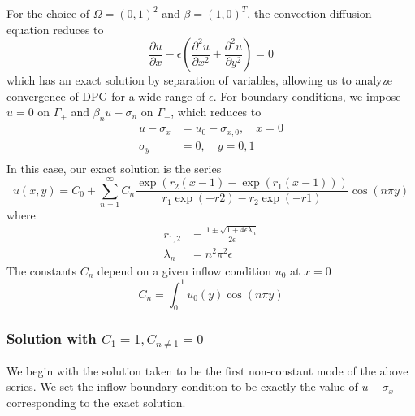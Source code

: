 \documentclass[11pt,onecolumn]{scrartcl}
\newcommand{\pd}[2]{\frac{\partial#1}{\partial#2}}
\newcommand{\pdd}[2]{\frac{\partial^2#1}{\partial#2^2}}
\begin{document}
For the choice of $\Omega = (0,1)^2$ and $\beta = (1,0)^T$, the convection diffusion equation reduces to
\[
\pd{u}{x} - \epsilon \left(\pdd{u}{x}+ \pdd{u}{y}\right) = 0
\]
which has an exact solution by separation of variables, allowing us to analyze convergence of DPG for a wide range of $\epsilon$.  For boundary conditions, we impose $u=0$ on $\Gamma_+$ and $\beta_n u - \sigma_n$ on $\Gamma_-$, which reduces to
\begin{align*}
u-\sigma_x &= u_0-\sigma_{x,0}, \quad x=0\\
\sigma_y &=  0, \quad y=0,1\\
\end{align*}
In this case, our exact solution is the series
\[
u(x,y) = C_0 + \sum_{n=1}^\infty C_n \frac{\exp(r_2(x-1)-\exp(r_1(x-1)))}{r_1\exp(-r2) - r_2\exp(-r1)}\cos(n\pi y)
\]
where
\begin{align*}
r_{1,2} &= \frac{1 \pm \sqrt{1 + 4 \epsilon\lambda_n}}{2 \epsilon}\\
\lambda_n &= n^2\pi^2 \epsilon
\end{align*}
The constants $C_n$ depend on a given inflow condition $u_0$ at $x=0$
\[
C_n = \int_0^1 u_0(y) \cos(n\pi y)
\]

\subsubsection{Solution with $C_1 = 1, C_{n\neq 1} = 0$}

We begin with the solution taken to be the first non-constant mode of the above series.  We set the inflow boundary condition to be exactly the value of $u-\sigma_x$ corresponding to the exact solution.  
\end{document}
